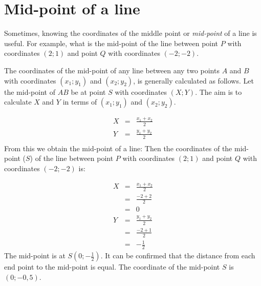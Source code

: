 \section{Mid-point of a line}

Sometimes, knowing the coordinates of the middle point or \textsl{mid-point} of a line is useful. For example, what is the mid-point of the line between point $P$ with coordinates $(2;1)$ and point $Q$ with coordinates $(-2;-2)$.\par 
The coordinates of the mid-point of any line between any two points $A$ and $B$ with coordinates $({x}_{1};{y}_{1})$ and $({x}_{2};{y}_{2})$, is generally calculated as follows. Let the mid-point of $AB$ be at point $S$ with coordinates $(X;Y)$. The aim is to calculate $X$ and $Y$ in terms of $({x}_{1};{y}_{1})$ and $({x}_{2};{y}_{2})$.\par 
\setcounter{subfigure}{0}
\begin{figure}[H] %
\begin{center}
\end{center}
\end{figure}      

\begin{eqnarray*}
X & = & \frac{{x}_{1} + {x}_{2}}{2} \\ 
Y & = & \frac{{y}_{1} + {y}_{2}}{2} \\  
\end{eqnarray*}
From this we obtain the mid-point of a line:
Then the coordinates of the mid-point ($S$) of the line between point $P$ with coordinates $(2;1)$ and point $Q$ with coordinates $(-2;-2)$ is:


\begin{eqnarray*}
X & = & \frac{{x}_{1} + {x}_{2}}{2} \\ 
& = & \frac{-2 + 2}{2} \\ 
& = & 0 \\ 
Y & = & \frac{{y}_{1} + {y}_{2}}{2} \\ 
& = & \frac{-2 + 1}{2} \\ 
& = & -\frac{1}{2} 
\end{eqnarray*}
The mid-point is at $S(0;-\frac{1}{2})$. 
It can be confirmed that the distance from each end point to the mid-point is equal. The coordinate of the mid-point $S$ is $(0;-0,5)$.\par 

